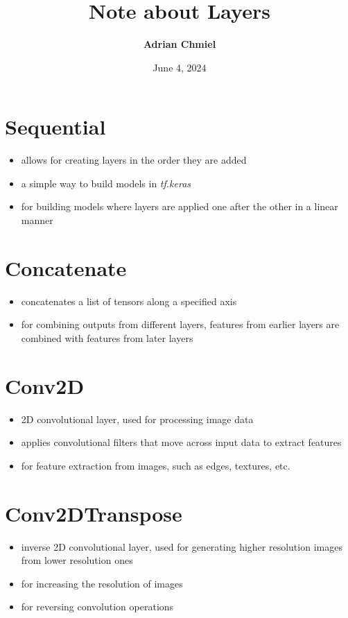 \documentclass{article}
\begin{document}
\title{\textbf{Note about Layers}}
\author{\textbf{Adrian Chmiel}}
\date{June 4, 2024}
\maketitle

\section{Sequential}
\begin{itemize}
    \item allows for creating layers in the order they are added
    \item a simple way to build models in \textit{tf.keras}
    \item for building models where layers are applied one after the other in a linear manner
\end{itemize}

\section{Concatenate}
\begin{itemize}
    \item concatenates a list of tensors along a specified axis
    \item for combining outputs from different layers, features from earlier layers are combined with features from later layers
\end{itemize}

\section{Conv2D}
\begin{itemize}
    \item 2D convolutional layer, used for processing image data
    \item applies convolutional filters that move across input data to extract features
    \item for feature extraction from images, such as edges, textures, etc.
\end{itemize}

\section{Conv2DTranspose}
\begin{itemize}
    \item inverse 2D convolutional layer, used for generating higher resolution images from lower resolution ones
    \item for increasing the resolution of images
    \item for reversing convolution operations
\end{itemize}
\end{document}
